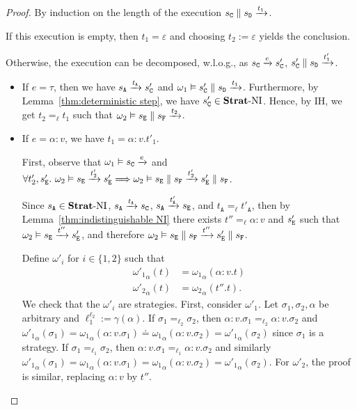 \documentclass[preprint,5p,twocolumn]{elsarticle}
\begin{document}
\begin{proof}
  By induction on the length of the execution $s_{\mathtt{C}} \parallel s_{\mathtt{D}} \xrightarrow{t_1}$.

  If this execution is empty, then $t_1 = \varepsilon$ and choosing $t_2 := \varepsilon$
  yields the conclusion.

  Otherwise, the execution can be decomposed, w.l.o.g., as $s_{\mathtt{C}} \xrightarrow{e} s_{\mathtt{C}}'$, $s_{\mathtt{C}}' \parallel s_{\mathtt{D}} \xrightarrow{t_1'}$. 
  \begin{itemize}
  \item If $e = \tau$, then we have $s_{\mathtt{A}} \xrightarrow{t_{\mathtt{A}}} s_{\mathtt{C}}'$ and
    $\omega_1 \vDash s_{\mathtt{C}}' \parallel s_{\mathtt{D}} \xrightarrow{t_1}$. Furthermore, by
    Lemma~\ref{thm:deterministic step}, we have $s_{\mathtt{C}}' \in \mathbf{Strat}\text{-}\mathrm{NI}$.
    Hence, by IH, we get $t_2 =_\ell t_1$ such
    that $\omega_2 \vDash s_{\mathtt{E}} \parallel s_{\mathtt{F}} \xrightarrow{t_2}$.

  \item If $e = \alpha:v$, we have $t_1 = \alpha:v.t'_1$.

    First, observe that
    $\omega_1 \vDash s_{\mathtt{C}} \xrightarrow{e}$ and
    $\forall t'_2,s_{\mathtt{E}}'.~\omega_2 \vDash s_{\mathtt{E}} \xrightarrow{t_2'} s_{\mathtt{E}}' \Longrightarrow \omega_2 \vDash s_{\mathtt{E}} \parallel s_{\mathtt{F}} \xrightarrow{t_2'} s_{\mathtt{E}}' \parallel s_{\mathtt{F}}$.

    Since $s_{\mathtt{A}} \in \mathbf{Strat}\text{-}\mathrm{NI}$, $s_{\mathtt{A}} \xrightarrow{t_{\mathtt{A}}} s_{\mathtt{C}}$, $s_{\mathtt{A}} \xrightarrow{t'_{\mathtt{A}}} s_{\mathtt{E}}$,
    and $t_{\mathtt{A}} =_\ell t'_{\mathtt{A}}$, then by Lemma~\ref{thm:indistinguishable NI} there
    exists $t'' =_\ell \alpha:v$ and $s_{\mathtt{E}}'$ such that
    $\omega_2 \vDash s_{\mathtt{E}} \xrightarrow{t''} s_{\mathtt{E}}'$,  and therefore
    $\omega_2 \vDash s_{\mathtt{E}} \parallel s_{\mathtt{F}} \xrightarrow{t''} s_{\mathtt{E}}' \parallel s_{\mathtt{F}}$.

    Define $\omega'_i$ for $i \in \{1,2\}$ such that
    \begin{align*}
      {\omega'_1}_\alpha(t) &= {\omega_1}_\alpha(\alpha:v.t)\\
      {\omega'_2}_\alpha(t) &= {\omega_2}_\alpha(t''.t).
    \end{align*}
    We check that the $\omega'_i$ are strategies. First, consider $\omega'_1$. Let $\sigma_1,\sigma_2,\alpha$ be
    arbitrary and $\ell_1^{\ell_2} := \gamma(\alpha)$. If $\sigma_1 =_{\ell_2} \sigma_2$, then
    $\alpha:v.\sigma_1 =_{\ell_2} \alpha:v.\sigma_2$ and
    ${\omega'_1}_\alpha(\sigma_1) = {\omega_1}_\alpha(\alpha:v.\sigma_1) \doteq {\omega_1}_\alpha(\alpha:v.\sigma_2)={\omega'_1}_\alpha(\sigma_2)$
    since $\sigma_1$ is a strategy.  If $\sigma_1 =_{\ell_1} \sigma_2$, then
    $\alpha:v.\sigma_1 =_{\ell_1} \alpha:v.\sigma_2$ and similarly
    ${\omega'_1}_\alpha(\sigma_1) = {\omega_1}_\alpha(\alpha:v.\sigma_1) = {\omega_1}_\alpha(\alpha:v.\sigma_2)={\omega'_1}_\alpha(\sigma_2)$.
    For $\omega'_2$, the proof is similar, replacing $\alpha:v$ by $t''$.


\end{itemize}
\end{proof}
\end{document}
